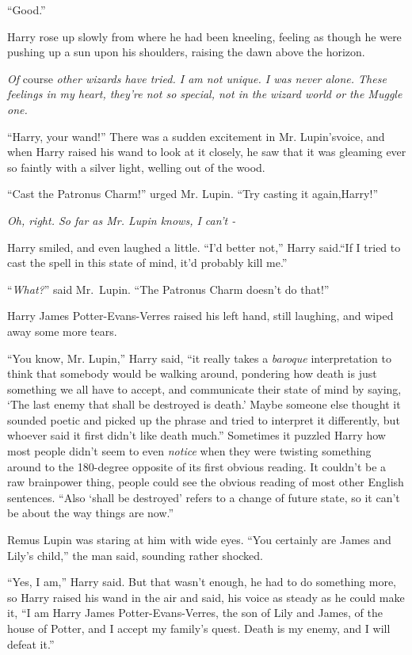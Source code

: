 ``Good.''

Harry rose up slowly from where he had been kneeling, feeling as though he were pushing up a sun upon his shoulders, raising the dawn above the horizon.

\emph{Of} course \emph{other wizards have tried. I am not unique. I was never alone. These feelings in my heart, they're not so special, not in the wizard world or the Muggle one.}

``Harry, your wand!'' There was a sudden excitement in Mr. Lupin'svoice, and when Harry raised his wand to look at it closely, he saw that it was gleaming ever so faintly with a silver light, welling out of the wood.

``Cast the Patronus Charm!'' urged Mr. Lupin. ``Try casting it again,Harry!''

\emph{Oh, right. So far as Mr. Lupin knows, I can't -}

Harry smiled, and even laughed a little. ``I'd better not,'' Harry said.``If I tried to cast the spell in this state of mind, it'd probably kill me.''

``\emph{What?}'' said Mr.~Lupin. ``The Patronus Charm doesn't do that!''

Harry James Potter-Evans-Verres raised his left hand, still laughing, and wiped away some more tears.

``You know, Mr. Lupin,'' Harry said, ``it really takes a \emph{baroque} interpretation to think that somebody would be walking around, pondering how death is just something we all have to accept, and communicate their state of mind by saying, `The last enemy that shall be destroyed is death.' Maybe someone else thought it sounded poetic and picked up the phrase and tried to interpret it differently, but whoever said it first didn't like death much.'' Sometimes it puzzled Harry how most people didn't seem to even \emph{notice} when they were twisting something around to the 180-degree opposite of its first obvious reading. It couldn't be a raw brainpower thing, people could see the obvious reading of most other English sentences. ``Also `shall be destroyed' refers to a change of future state, so it can't be about the way things are now.''

Remus Lupin was staring at him with wide eyes. ``You certainly are James and Lily's child,'' the man said, sounding rather shocked.

``Yes, I am,'' Harry said. But that wasn't enough, he had to do something more, so Harry raised his wand in the air and said, his voice as steady as he could make it, ``I am Harry James Potter-Evans-Verres, the son of Lily and James, of the house of Potter, and I accept my family's quest. Death is my enemy, and I will defeat it.''

